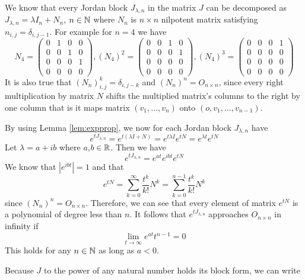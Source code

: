 We know that every Jordan block $J_{\lambda,n}$ in the matrix $J$ can be decomposed as $J_{\lambda,n}=\lambda I_n+N_n$, $n \in\mathbb{N}$ where $N_n$ is $n \times n$ nilpotent matrix satisfying $n_{i,j}=\delta_{i,j-1}$. For example for $n=4$ we have
\begin{equation*}
	N_4=
	\begin{pmatrix}
		0 & 1 & 0 & 0 \\
		0 & 0 & 1 & 0 \\
		0 & 0 & 0 & 1 \\
		0 & 0 & 0 & 0 
	\end{pmatrix},
	(N_4)^2=
	\begin{pmatrix}
		0 & 0 & 1 & 0 \\
		0 & 0 & 0 & 1 \\
		0 & 0 & 0 & 0 \\
		0 & 0 & 0 & 0 
	\end{pmatrix},
	(N_4)^3=
	\begin{pmatrix}
		0 & 0 & 0 & 1 \\
		0 & 0 & 0 & 0 \\
		0 & 0 & 0 & 0 \\
		0 & 0 & 0 & 0 
	\end{pmatrix}
\end{equation*}
It is also true that $(N_n)^k_{i,j}=\delta_{i,j-k}$ and $(N_n)^n=O_{n \times n}$, since every right multiplication by matrix $N$ shifts the multiplied matrix's columns to the right by one column that is it maps matrix $(v_1,\ldots,v_n)$ onto $(o,v_1,\ldots,v_{n-1})$. 

By using Lemma \ref{lem:expprop}, we now for each Jordan block $J_{\lambda,n}$ have $$e^{tJ_{\lambda,n}}=e^{t(\lambda I + N)}=e^{t\lambda I}e^{tN}=e^{\lambda t}e^{tN}$$ Let $\lambda = a+ib$ where $a$,$b \in \mathbb{R}$. Then we have $$e^{tJ_{\lambda,n}}=e^{at}e^{ibt}e^{tN}$$ We know that $|e^{ibt}|=1$ and that $$e^{tN}=\sum^\infty_{k=0}\frac{t^k}{k!}N^k=\sum^{n-1}_{k=0}\frac{t^k}{k!}N^k$$ since $(N_n)^n=O_{n \times n}$. Therefore, we can see that every element of matrix $e^{tN}$ is a polynomial of degree less than $n$. It follows that $e^{tJ_{\lambda,n}}$ approaches $O_{n \times n}$ in infinity if $$\lim_{t\to\infty}e^{at}t^{n-1}=0$$ This holds for any $n\in\mathbb{N}$ as long as $a<0$. 

Because $J$ to the power of any natural number holds its block form, we can write

